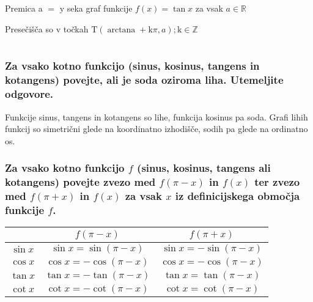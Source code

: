 \documentclass{article}
\begin{document}
Premica a $=$ y seka graf funkcije $f(x)=\tan x$ za vsak $a \in \mathbb{R}$

Presečišča so v točkah $\mathrm{T}(\operatorname{arctana}+\mathrm{k} \pi, a) ; \mathrm{k} \in \mathbb{Z}$

\section{\texorpdfstring{}{Kotne funkcije}}
\subsubsection*{Za vsako kotno funkcijo (sinus, kosinus, tangens in kotangens) povejte, ali je soda oziroma liha. Utemeljite odgovore.}

Funkcije sinus, tangens in kotangens so lihe, funkcija kosinus pa soda. Grafi lihih funkcij so simetrični glede na koordinatno izhodišče, sodih pa glede na ordinatno os.


\subsubsection*{Za vsako kotno funkcijo $f$ (sinus, kosinus, tangens ali kotangens) povejte zvezo med $f(\pi-x)$ in $f(x)$ ter zvezo med $f(\pi+x)$ in $f(x)$ za vsak $x$ iz definicijskega območja funkcije $f$.}

\begin{center}
\begin{tabular}{|c|c|c|}
\hline
 & $f(\pi-x)$ & $f(\pi+x)$ \\
\hline
$\sin x$ & $\sin x=\sin (\pi-x)$ & $\sin x=-\sin (\pi-x)$ \\
\hline
$\cos x$ & $\cos x=-\cos (\pi-x)$ & $\cos x=-\cos (\pi-x)$ \\
\hline
$\tan x$ & $\tan x=-\tan (\pi-x)$ & $\tan x=\tan (\pi-x)$ \\
\hline
$\cot x$ & $\cot x=-\cot (\pi-x)$ & $\cot x=\cot (\pi-x)$ \\
\hline
\end{tabular}
\end{center}
\end{document}
